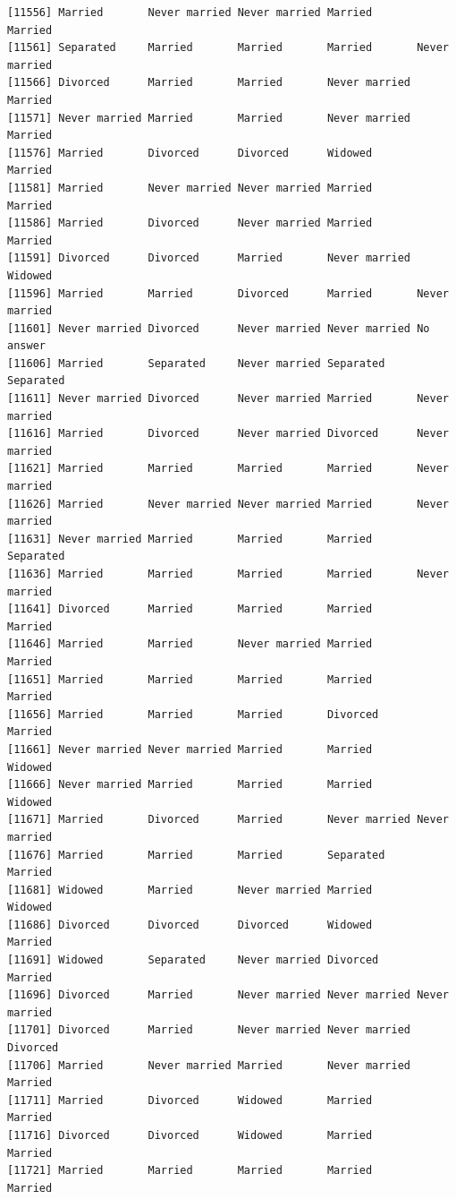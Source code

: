 \documentclass[
  letterpaper,
  DIV=11,
  numbers=noendperiod,
  oneside]{scrartcl}
\begin{document}
\begin{verbatim}
[11556] Married       Never married Never married Married       Married      
[11561] Separated     Married       Married       Married       Never married
[11566] Divorced      Married       Married       Never married Married      
[11571] Never married Married       Married       Never married Married      
[11576] Married       Divorced      Divorced      Widowed       Married      
[11581] Married       Never married Never married Married       Married      
[11586] Married       Divorced      Never married Married       Married      
[11591] Divorced      Divorced      Married       Never married Widowed      
[11596] Married       Married       Divorced      Married       Never married
[11601] Never married Divorced      Never married Never married No answer    
[11606] Married       Separated     Never married Separated     Separated    
[11611] Never married Divorced      Never married Married       Never married
[11616] Married       Divorced      Never married Divorced      Never married
[11621] Married       Married       Married       Married       Never married
[11626] Married       Never married Never married Married       Never married
[11631] Never married Married       Married       Married       Separated    
[11636] Married       Married       Married       Married       Never married
[11641] Divorced      Married       Married       Married       Married      
[11646] Married       Married       Never married Married       Married      
[11651] Married       Married       Married       Married       Married      
[11656] Married       Married       Married       Divorced      Married      
[11661] Never married Never married Married       Married       Widowed      
[11666] Never married Married       Married       Married       Widowed      
[11671] Married       Divorced      Married       Never married Never married
[11676] Married       Married       Married       Separated     Married      
[11681] Widowed       Married       Never married Married       Widowed      
[11686] Divorced      Divorced      Divorced      Widowed       Married      
[11691] Widowed       Separated     Never married Divorced      Married      
[11696] Divorced      Married       Never married Never married Never married
[11701] Divorced      Married       Never married Never married Divorced     
[11706] Married       Never married Married       Never married Married      
[11711] Married       Divorced      Widowed       Married       Married      
[11716] Divorced      Divorced      Widowed       Married       Married      
[11721] Married       Married       Married       Married       Married      

\end{verbatim}
\end{document}

